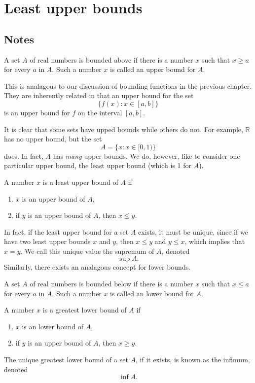 \section{Least upper bounds}

\subsection{Notes}
\begin{definition}
A set $A$ of real numbers is bounded above if there is a number $x$ such that $x \ge a$ for every $a$ in $A$. Such a number $x$ is called an upper bound for $A$.

\begin{remark}
This is analagous to our discussion of bounding functions in the previous chapter. They are inherently related in that an upper bound for the set 
\[ \{f(x): x \in [a, b]\} \]
is an upper bound for $f$ on the interval $[a, b]$.
\end{remark}
\end{definition}

It is clear that some sets have upped bounds while others do not. For example, $\mathbb{R}$ has no upper bound, but the set
\[ A = \{x: x \in [0, 1)\} \]
does. In fact, $A$ has \textit{many} upper bounds. We do, however, like to consider one particular upper bound, the least upper bound (which is 1 for $A$).

\begin{definition}
A number $x$ is a least upper bound of $A$ if
\begin{enumerate}
\item 
$x$ is an upper bound of $A$,
\item
if $y$ is an upper bound of $A$, then $x \le y$.
\end{enumerate}
\end{definition}

In fact, if the least upper bound for a set $A$ exists, it must be unique, since if we have two least upper bounds $x$ and $y$, then $x \le y$ and $y \le x$, which implies that $x = y$. We call this unique value the supremum of $A$, denoted
\[ \sup A. \] 
Similarly, there exists an analagous concept for lower bounds.
\begin{definition}
A set $A$ of real numbers is bounded below if there is a number $x$ such that $x \le a$ for every $a$ in $A$. Such a number $x$ is called an lower bound for $A$.
\end{definition} 
\begin{definition}
A number $x$ is a greatest lower bound of $A$ if
\begin{enumerate}
\item 
$x$ is an lower bound of $A$,
\item
if $y$ is an upper bound of $A$, then $x \ge y$.
\end{enumerate}
\end{definition}
The unique greatest lower bound of a set $A$, if it exists, is known as the infimum, denoted
\[ \inf A. \]

